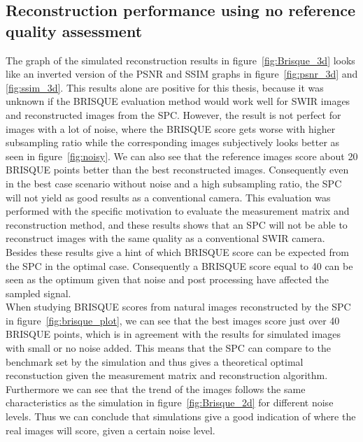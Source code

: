 \subsection{Reconstruction performance using no reference quality assessment}
The graph of the simulated reconstruction results in figure~\ref{fig:Brisque_3d} looks like an inverted version of the PSNR and SSIM graphs in figure~\ref{fig:psnr_3d} and \ref{fig:ssim_3d}. This results alone are positive for this thesis, because it was unknown if the BRISQUE evaluation method would work well for SWIR images and  reconstructed images from the SPC. However, the result is not perfect for images with a lot of noise, where the BRISQUE score gets worse with higher subsampling ratio while the corresponding images subjectively looks better as seen in figure~\ref{fig:noisy}. We can also see that the reference images score about 20 BRISQUE points better than the best reconstructed images. Consequently even in the best case scenario without noise and a high subsampling ratio, the SPC will not yield as good results as a conventional camera. This evaluation was performed with the specific motivation to evaluate the measurement matrix and reconstruction method, and these results shows that an SPC will not be able to reconstruct images with the same quality as a conventional SWIR camera. Besides these results give a hint of which BRISQUE score can be expected from the SPC in the optimal case. Consequently a BRISQUE score equal to 40 can be seen as the optimum given that noise and post processing have affected the sampled signal.\\[0.1in]


When studying BRISQUE scores from natural images reconstructed by the SPC in figure~\ref{fig:brisque_plot}, we can see that the best images score just over 40 BRISQUE points, which is in agreement with the results for simulated images with small or no noise added. This means that the SPC can compare to the benchmark set by the simulation and thus gives a theoretical optimal reconstuction given the measurement matrix and reconstruction algorithm. Furthermore we can see that the trend of the images follows the same characteristics as the simulation in figure~\ref{fig:Brisque_2d} for different noise levels. Thus we can conclude that simulations give a good indication of where the real images will score, given a certain noise level.\\[0.1in]


